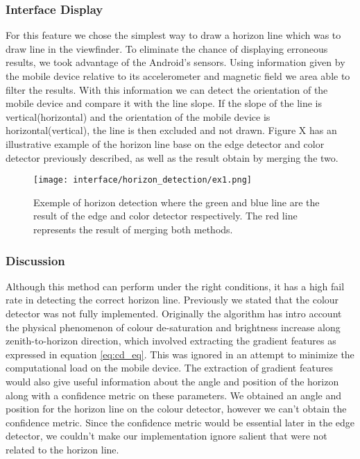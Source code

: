 \subsubsection{Interface Display}

For this feature we chose the simplest way to draw a horizon line which was to draw line in the viewfinder. To eliminate the chance of displaying erroneous results, we took advantage of the Android's sensors. Using information given by the mobile device relative to its accelerometer and magnetic field we area able to filter the results. With this information we can detect the orientation of the mobile device and compare it with the line slope. If the slope of the line is vertical(horizontal) and the orientation of the mobile device is horizontal(vertical), the line is then excluded and not drawn. Figure X has an illustrative example of the horizon line base on the edge detector and color detector previously described, as well as the result obtain by merging the two.
\begin{figure}[htbp]
	\centering
    \texttt{[image: interface/horizon\_detection/ex1.png]}
    \caption{Exemple of horizon detection where the green and blue line are the result of the edge and color detector respectively. The red line represents the result of merging both methods.}
    \label{fig:hori_ex}
\end{figure}

\subsubsection{Discussion}

Although this method can perform under the right conditions, it has a high fail rate in detecting the correct horizon line. Previously we stated that the colour detector was not fully implemented. Originally the algorithm has intro account the physical phenomenon of colour de-saturation and brightness increase along zenith-to-horizon direction, which involved extracting the gradient features as expressed in equation \ref{eq:cd_eq}. This was ignored in an attempt to minimize the computational load on the mobile device. 
The extraction of gradient features would also give useful information about the angle and position of the horizon along with a confidence metric on these parameters. We obtained an angle and position for the horizon line on the colour detector, however we can't obtain the confidence metric. Since the confidence metric would be essential later in the edge detector, we couldn't make our implementation ignore salient that were not related to the horizon line.


